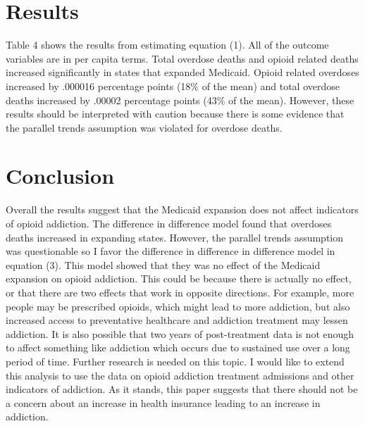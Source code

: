 \documentclass{article}
\begin{document}



\section{Results}
Table 4 shows the results from estimating equation (1).  All of the outcome variables are in per capita terms. Total overdose deaths and opioid related deaths increased significantly in states that expanded Medicaid.  Opioid related overdoses increased by .000016 percentage points (18$\%$ of the mean) and total overdose deaths increased by .00002 percentage points (43$\%$ of the mean).  However, these results should be interpreted with caution because there is some evidence that the parallel trends assumption was violated for overdose deaths.     


\section{Conclusion}

Overall the results suggest that the Medicaid expansion does not affect indicators of opioid addiction.  The difference in difference model found that overdoses deaths increased in expanding states.  However, the parallel trends assumption was questionable so I favor the difference in difference in difference model in equation (3).  This model showed that they was no effect of the Medicaid expansion on opioid addiction.  This could be because there is actually no effect, or that there are two effects that work in opposite directions.  For example, more people may be prescribed opioids, which might lead to more addiction, but also increased access to preventative healthcare and addiction treatment may lessen addiction.  It is also possible that two years of post-treatment data is not enough to affect something like addiction which occurs due to sustained use over a long period of time.  Further research is needed on this topic.  I would like to extend this analysis to use the data on opioid addiction treatment admissions and other indicators of addiction.  As it stands, this paper suggests that there should not be a concern about an increase in health insurance leading to an increase in addiction. 



\end{document}
